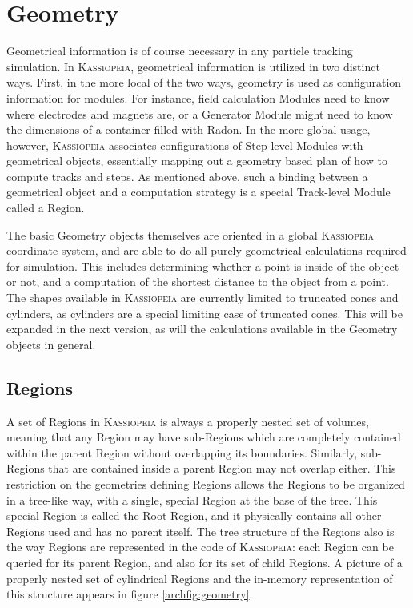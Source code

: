 \section{Geometry}
\label{arch:geometry}

Geometrical information is of course necessary in any particle tracking simulation.  In \textsc{Kassiopeia}, geometrical information is utilized in two distinct ways.  First, in the more local of the two ways, geometry is used as configuration information for modules.  For instance, field calculation Modules need to know where electrodes and magnets are, or a Generator Module might need to know the dimensions of a container filled with Radon.  In the more global usage, however, \textsc{Kassiopeia} associates configurations of Step level Modules with geometrical objects, essentially mapping out a geometry based plan of how to compute tracks and steps.  As mentioned above, such a binding between a geometrical object and a computation strategy is a special Track-level Module called a Region.

The basic Geometry objects themselves are oriented in a global \textsc{Kassiopeia} coordinate system, and are able to do all purely geometrical calculations required for simulation.  This includes determining whether a point is inside of the object or not, and a computation of the shortest distance to the object from a point.  The shapes available in \textsc{Kassiopeia} are currently limited to truncated cones and cylinders, as cylinders are a special limiting case of truncated cones.  This will be expanded in the next version, as will the calculations available in the Geometry objects in general.

\subsection{Regions}
\label{arch:regions}

A set of Regions in \textsc{Kassiopeia} is always a properly nested set of volumes, meaning that any Region may have sub-Regions which are completely contained within the parent Region without overlapping its boundaries.  Similarly, sub-Regions that are contained inside a parent Region may not overlap either.  This restriction on the geometries defining Regions allows the Regions to be organized in a tree-like way, with a single, special Region at the base of the tree.  This special Region is called the Root Region, and it physically contains all other Regions used and has no parent itself.  The tree structure of the Regions also is the way Regions are represented in the code of \textsc{Kassiopeia}:  each Region can be queried for its parent Region, and also for its set of child Regions.  A picture of a properly nested set of cylindrical Regions and the in-memory representation of this structure appears in figure \ref{archfig:geometry}.

